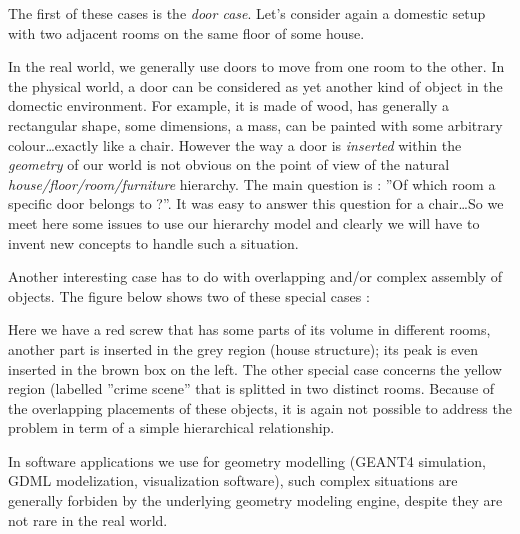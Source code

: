 \pn The first of these cases is the \emph{door case}. Let's consider again a
domestic setup with two adjacent rooms on the same floor of some house.

\begin{center}
  \scalebox{1.0}{}
\end{center}


\pn In the real world, we generally use doors to move from one room to
the other.  In the  physical world,  a door can  be considered  as yet
another kind of  object in the domectic environment.   For example, it
is made of wood, has generally a rectangular shape, some dimensions, a
mass, can  be painted with  some arbitrary colour\dots exactly  like a
chair.  However   the  way  a   door  is  \emph{inserted}   within  the
\emph{geometry} of  our world is not  obvious on the point  of view of
the  natural  \emph{house/floor/room/furniture}  hierarchy.  The  main
question is : ''Of which room  a specific door belongs to ?''.  It was
easy to  answer this question  for a chair\dots  So we meet  here some
issues to use  our hierarchy model and clearly we  will have to invent
new concepts to handle such a situation.

\pn Another interesting case has to do with overlapping and/or complex
assembly of objects. The figure below shows two of these special cases
:
\begin{center}
  \scalebox{1.0}{}
\end{center}

\pn Here  we have a  red screw  that has some  parts of its  volume in
different rooms,  another part is  inserted in the grey  region (house
structure);  its  peak  is even  inserted  in  the  brown box  on  the
left.  The other  special case  concerns the  yellow  region (labelled
''crime scene'' that  is splitted in two distinct  rooms. Because of
the overlapping placements of these  objects, it is again not possible
to address the problem in term of a simple hierarchical relationship.

\pn  In software applications  we use  for geometry  modelling (GEANT4
simulation, GDML  modelization, visualization software),  such complex
situations are generally forbiden  by the underlying geometry modeling
engine, despite they are not rare in the real world.

